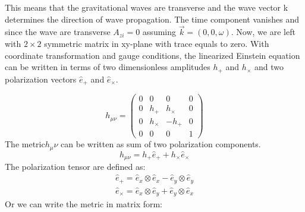 \documentclass{ttuthes2007}
\begin{document}
This means that the gravitational waves are transverse and the wave vector k
determines the direction of wave propagation. The time component vanishes and
since the wave are transverse $A_{zi}=0$ assuming $\vec{k}=(0,0,\omega)$. Now,
we are left with $2 \times 2$ symmetric matrix in xy-plane with trace equals to
zero. With coordinate transformation and gauge conditions, the linearized
Einstein equation can be written in terms of two dimensionless amplitudes
$h_+$ and $h_\times$ and two polarization vectors $\hat e_+$ and $\hat e_\times$.

\begin{equation*}                                                               
h_{\mu\nu}=                                                                  
 \begin{pmatrix}                                                                
    0 & 0 & 0 & 0 \\                                                           
    0 & h_+ & h_\times & 0 \\                                                            
    0 & h_\times & -h_+ & 0 \\                                                            
    0 & 0 & 0 & 1                                                               
 \end{pmatrix}                                                                  
\end{equation*} 
The metric$h_\mu\nu$ can be written as sum of two polarization components.   
\begin{equation}
h_{\mu\nu}=h_+\hat e_+ +h_\times \hat e_\times
\end{equation}
The polarization tensor are defined as:
\begin{equation}
\begin{aligned}
\hat e_+ = \hat e_x \otimes \hat e_x - \hat e_y \otimes \hat e_y \\
\hat e_\times = \hat e_x \otimes \hat e_y + \hat e_y \otimes \hat e_x
\end{aligned}
\end{equation}
Or we can write the metric in matrix form:
\end{document}
